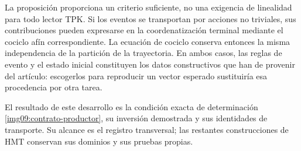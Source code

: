 La proposición proporciona un criterio suficiente, no una exigencia de
linealidad para todo lector TPK. Si los eventos se transportan por acciones
no triviales, sus contribuciones pueden expresarse en la coordenatización terminal
mediante el cociclo afín correspondiente. La ecuación de cociclo conserva
entonces la misma independencia de la partición de la trayectoria.
En ambos casos, las reglas de evento y el estado inicial constituyen los
datos constructivos que han de provenir del artículo: escogerlos para
reproducir un vector esperado sustituiría esa procedencia por otra tarea.

El resultado de este desarrollo es la condición exacta de determinación
\eqref{img09:contrato-productor}, su inversión demostrada y sus identidades
de transporte. Su alcance es el registro transversal; las restantes
construcciones de HMT conservan sus dominios y sus pruebas propias.

